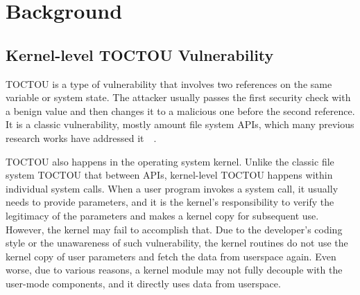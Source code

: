 
\section{Background}
\label{sec:ktoctou-background}



%



\subsection{Kernel-level TOCTOU Vulnerability}

TOCTOU is a type of vulnerability that involves two references on the same variable or system state. The attacker usually passes the first security check with a benign value and then changes it to a malicious one before the second reference. It is a classic vulnerability, mostly amount file system APIs, which many previous research works have addressed it~\cite{dean2004fixing}~\cite{borisov2005fixing}.


TOCTOU also happens in the operating system kernel. Unlike the classic file system TOCTOU that between APIs, kernel-level TOCTOU happens within individual system calls. When a user program invokes a system call, it usually needs to provide parameters, and it is the kernel's responsibility to verify the legitimacy of the parameters and makes a kernel copy for subsequent use. However, the kernel may fail to accomplish that. Due to the developer's coding style or the unawareness of such vulnerability, the kernel routines do not use the kernel copy of user parameters and fetch the data from userspace again. Even worse, due to various reasons, a kernel module may not fully decouple with the user-mode components, and it directly uses data from userspace.


